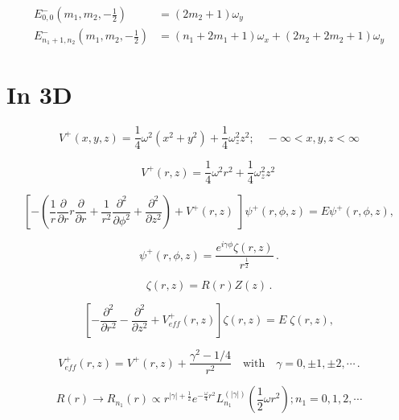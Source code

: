 \documentclass[12pt]{article}
\begin{document}
\begin{align} 
	E^-_{0,0}(m_1,m_2,-\frac{1}{2}) &=\left(2m_2+1\right)\omega_y\\
	E^-_{n_1+1,n_2}(m_1,m_2,-\frac{1}{2}) &= \left(n_1+2m_1+1\right)\omega_x+ \left(2n_2+2m_2+1\right)\omega_y
\end{align}

\section*{In 3D}

\begin{equation}
V^+(x,y,z)=\frac{1}{4}\omega^2 (x^2+y^2)+\frac{1}{4}\omega_z^2 z^2; \quad -\infty<x,y,z<\infty
\end{equation}

\begin{equation}
  V^+(r,z)=\frac{1}{4}\omega^2 r^2+\frac{1}{4}\omega_z^2 z^2\,
\end{equation}

\begin{equation}\label{cylinderical-SE}
  \left[-\left(\frac{1}{r}\frac{\partial }{\partial r}r\frac{\partial }{\partial r}+\frac{1}{r^2}\frac{\partial^2 }{\partial \phi^2}+\frac{\partial^2 }{\partial z^2}\right)+V^+(r,z)\;\right]\psi^+(r,\phi,z)=E\psi^+ (r,\phi,z),
\end{equation}

\begin{equation}\label{rphiz}
\psi^+ (r,\phi,z)=\frac{e^{i\gamma \phi} \zeta(r,z)}{r^{\frac{1}{2}}}\,.
\end{equation}

\begin{equation}
\zeta(r,z) = R(r) Z(z)\,.
\end{equation}

\begin{equation}
\left[-\frac{\partial^2}{\partial r^2}-\frac{\partial^2}{\partial z^2}
+V^+_{eff}(r,z)\right]\zeta(r,z)=E\;\zeta(r,z),
\end{equation}

\begin{equation}
V^+_{eff}(r,z)=V^+(r,z)+\frac{\gamma^2-1/4}{r^2}\quad\text{with}\quad  
\gamma=0,\pm1,\pm2,\cdots \,.
\end{equation} 

\begin{equation}
R(r)\rightarrow R_{n_1}(r)\propto r^{|\gamma|+\frac{1}{2}}e^{-\frac{\omega}{4}r^2}L_{n_1}^{(|\gamma|)}\left(\frac{1}{2}\omega r^2\right); n_1=0,1,2,\cdots
\end{equation}
\end{document}
